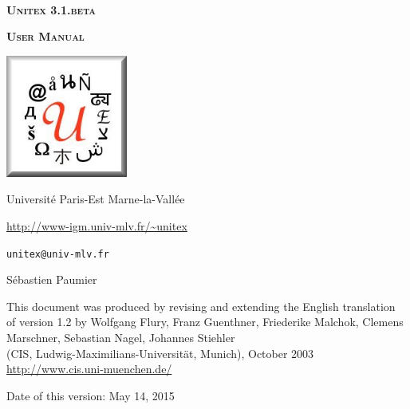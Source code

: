 
\begin{titlepage}
\begin{center}

~

\vspace{3cm}
\Huge
\textsc{\textbf{Unitex 3.1.beta}}

\vspace{1cm}

\huge
\textsc{\textbf{User Manual}}

\vspace{2cm}

  \begin{center}
    \includegraphics[width=4cm]{resources/img/logo-Unitex.png}
  \end{center}
\normalsize

\vspace{2cm}

\LARGE

Université Paris-Est Marne-la-Vallée
\bigskip
\normalsize

\url{http://www-igm.univ-mlv.fr/~unitex}

\verb$unitex@univ-mlv.fr$

\vspace{0.5cm}

Sébastien Paumier
\bigskip

This document was produced by revising and extending the English translation\\
of version 1.2 by Wolfgang Flury, Franz Guenthner, Friederike Malchok, Clemens Marschner, 
 Sebastian Nagel, Johannes Stiehler\\
 (CIS, Ludwig-Maximilians-Universit\"at, Munich), October 2003\\
\url{http://www.cis.uni-muenchen.de/}

\bigskip
Date of this version: May 14, 2015
\end{center}

\end{titlepage}
